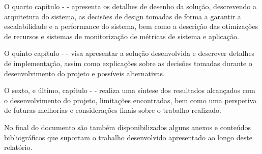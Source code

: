 O quarto capítulo -  - apresenta os detalhes de desenho da solução,
descrevendo a arquitetura do sistema, as decisões de design tomadas de forma a garantir a escalabilidade
e a performance do sistema, bem como a descrição das otimizações de recursos e sistemas de monitorização
de métricas de sistema e aplicação.

O quinto capítulo -  - visa apresentar a solução desenvolvida e 
descrever detalhes de implementação, assim como explicações sobre as decisões tomadas durante o
desenvolvimento do projeto e possíveis alternativas.

O sexto, e último, capítulo -  - realiza uma síntese dos resultados 
alcançados com o desenvolvimento do projeto, limitações encontradas, bem como uma perspetiva de 
futuras melhorias e considerações finais sobre o trabalho realizado.

No final do documento são também disponibilizados alguns anexos e conteúdos bibliográficos que 
suportam o trabalho desenvolvido apresentado ao longo deste relatório.
